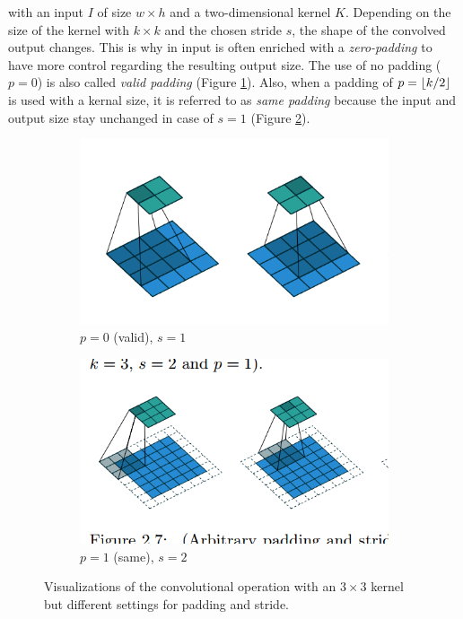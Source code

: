 with an input $ I $ of size $w \times h$ and a two-dimensional kernel $ K $. Depending on the size of the kernel with $ k \times k $ and the chosen stride $ s $, the shape of the convolved output changes. This is why in input is often enriched with a \textit{zero-padding} to have more control regarding the resulting output size. The use of no padding ($p=0$) is also called \textit{valid padding} (Figure \ref{fig:conv_valid}). Also, when a padding of $p=\lfloor k/2\rfloor$ is used with a kernal size, it is referred to as \textit{same padding} because the input and output size stay unchanged in case of $ s=1 $ (Figure \ref{fig:conv_same}). 

\begin{figure}[htpb]
\centering
\begin{subfigure}{0.5\textwidth}
  \centering
  \includegraphics[width=.9\linewidth]{figures/conv_valid.png}
  \caption{$p=0$ (valid), $s=1$}
  \label{fig:conv_valid}
\end{subfigure}%
\begin{subfigure}{0.5\textwidth}
  \centering
  \includegraphics[width=0.9\linewidth]{figures/conv_same.png}
  \caption{$p=1$ (same), $s=2$}
  \label{fig:conv_same}
\end{subfigure}
\caption[Convolution operation]{Visualizations of the convolutional operation with an $3 \times 3$ kernel but different settings for padding and stride.}
\label{fig:conv}
\end{figure}



